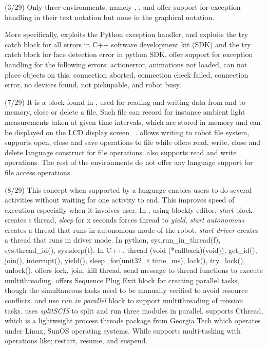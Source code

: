 \parhead{\fexceptions} (3/29) Only three environments, namely \openroberta, \choregraphe, and \codelab offer support for exception handling in their text notation but none in the graphical notation. %

More specifically, \openroberta exploits the Python exception handler, and \choregraphe exploits the try catch block for all errors in C++ software development kit (SDK) and the try catch block for face detection error in python SDK. \codelab offer support for exception handling for the following errors: actionerror, animations not loaded, can not place objects on this, connection aborted, connection check failed, connection error, no devices found, not pickupable, and robot busy.

\parhead{\ffileaccess} (7/29) It is a block found in \lego, used for reading and writing data from and to memory, close or delete a file. Such file can record for instance ambient light measurements taken at given time intervals, which are stored in memory and can be displayed on the LCD display screen ~\cite{LEGO}. \trik allows writing to robot file system, \choregraphe supports open, close and save operations to file while \missionlab offers read, write, close and delete language construct for file operations. \picaxe also supports read and write operations. The rest of the environments do not offer any language support for file access operations.

\parhead{\fmultithread} (8/29) This concept when supported by a language enables users to do several activities without waiting for one activity to end. This improves speed of execution especially when it involves user. In \robotmesh,  using blockly editor,  \textit{start} block creates s thread, \textit{sleep} for x seconds forces thread to \textit{yield}, \textit{start autonomous} creates a thread that runs in autonomous mode of the robot, \textit{start driver} creates a thread that runs in driver mode. In python, sys.run\_in\_thread(f), sys.thread\_id(), sys.sleep(t). In C++, thread (void (*callback)(void)), get\_id(), join(), interrupt(), yield(), sleep\_for(unit32\_t time\_ms), lock(), try\_lock(), unlock(). \trik offers fork, join, kill thread, send message to thread functions to execute multithreading. \lego offers Sequence Plug Exit block for creating parallel tasks, though the simultaneous tasks need to be manually verified to avoid resource conflicts. \makecode and \robotc use \textit{run in parallel} block to support multithreading of mission tasks. \tivipe uses \textit{splitSCIS} to split and run three modules  in parallel. \missionlab supports Cthread, which is a lightweight process threads package from Georgia Tech which operates under Linux, SunOS operating systems. While \picaxe supports multi-tasking with operations like; restart, resume, and suspend.













